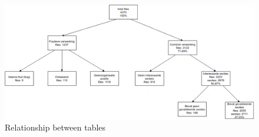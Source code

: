 \documentclass{ou-report}
\begin{document}
\begin{figure}[H]
    \centering
    \includegraphics[width=17cm]{images/lncs_front_matter_result.drawio.png}
    \caption{Relationship between tables}
    \label{fig:lncs_pdf_database}
\end{figure}


\end{document}
